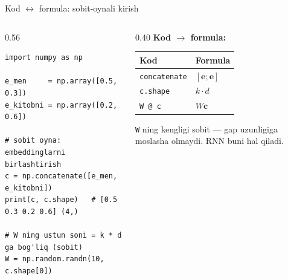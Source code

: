 \documentclass[aspectratio=169,11pt]{beamer}
\begin{document}
\begin{frame}[fragile]{Kod $\leftrightarrow$ formula: sobit-oynali kirish}
  \begin{columns}[T]
    \begin{column}{0.56\textwidth}
\begin{lstlisting}
import numpy as np

e_men     = np.array([0.5, 0.3])
e_kitobni = np.array([0.2, 0.6])

# sobit oyna: embeddinglarni birlashtirish
c = np.concatenate([e_men, e_kitobni])
print(c, c.shape)   # [0.5 0.3 0.2 0.6] (4,)

# W ning ustun soni = k * d ga bog'liq (sobit)
W = np.random.randn(10, c.shape[0])
\end{lstlisting}
    \end{column}
    \begin{column}{0.40\textwidth}
      \textbf{Kod $\to$ formula:}\\[3pt]
      \footnotesize
      \begin{tabular}{p{2.0cm}p{2.0cm}}
        \toprule
        Kod & Formula \\
        \midrule
        \texttt{concatenate} & $[\mathbf{e};\mathbf{e}]$ \\
        \texttt{c.shape} & $k\cdot d$ \\
        \texttt{W @ c} & $W\mathbf{c}$ \\
        \bottomrule
      \end{tabular}
      \vspace{4pt}
      \begin{tcolorbox}[warnbox,top=2pt,bottom=2pt]
        \footnotesize
        \texttt{W} ning kengligi sobit --- gap uzunligiga moslasha olmaydi.
        RNN buni hal qiladi.
      \end{tcolorbox}
    \end{column}
  \end{columns}
\end{frame}
\end{document}
